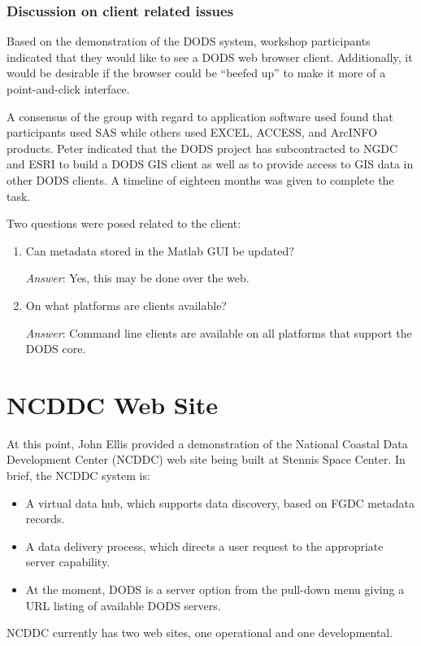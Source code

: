 \subsubsection{Discussion on client related issues}

Based on the demonstration of the DODS system, workshop participants
indicated that they would like to see a DODS web browser client.
Additionally, it would be desirable if the browser could be ``beefed
up'' to make it more of a point-and-click interface.

A consensus of the group with regard to application software used
found that participants used SAS while others used EXCEL, ACCESS, and
ArcINFO products.  Peter indicated that the DODS project has
subcontracted to NGDC and ESRI to build a DODS GIS client as well as
to provide access to GIS data in other DODS clients.  A timeline of
eighteen months was given to complete the task.

Two questions were posed related to the client:
\begin{enumerate}
\item Can metadata stored in the Matlab GUI be updated?  

\emph{Answer}: Yes,
  this may be done over the web.
\item On what platforms are clients available?  

\emph{Answer}: Command line
  clients are available on all platforms that support the DODS core.
\end{enumerate}

\section{NCDDC Web Site}

At this point, John Ellis provided a demonstration of the National
Coastal Data Development Center (NCDDC) web site being built at
Stennis Space Center.  In brief, the NCDDC system is:
\begin{itemize}
  \item A virtual data hub, which supports data discovery, based on FGDC
metadata records.
  \item A data delivery process, which directs a user request to the
appropriate server capability.
  \item At the moment, DODS is a server option from the pull-down menu
giving a URL listing of available DODS servers.
\end{itemize}

NCDDC currently has two web sites, one operational and one developmental.

